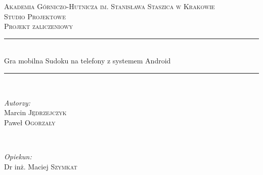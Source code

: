 \documentclass[a4paper, 11pt]{article}
\author{Marcin Jędrzejczyk,Paweł Ogorzały}
\newcommand{\HRule}{\rule{\linewidth}{0.5mm}} %
\begin{document}
	\begin{titlepage}
	
	
		
		
		
		\center %
		
		
		\textsc{\LARGE Akademia Górniczo-Hutnicza im. Stanisława Staszica w Krakowie}\\[1.5cm] %
		\textsc{\Large Studio Projektowe \\ Projekt zaliczeniowy}\\[1.5cm]
		
		
		\HRule \\[0.4cm]
		{\fontsize{30}{40}\selectfont Gra mobilna Sudoku na telefony z systemem Android}
		\HRule \\[5.5cm]
		
		

\begin{minipage}{0.4\textwidth}
\begin{flushleft} \large 
\emph{Autorzy:}\\
Marcin \textsc{Jędrzejczyk}\\ 
Paweł \textsc{Ogorzały}
\end{flushleft}
\end{minipage}
~
\begin{minipage}{0.4\textwidth}
\begin{flushright} \large
\emph{Opiekun:}\\
 Dr inż. Maciej \textsc{Szymkat}  %
\end{flushright}
\end{minipage} \\[5cm]


\end{titlepage}
\end{document}

